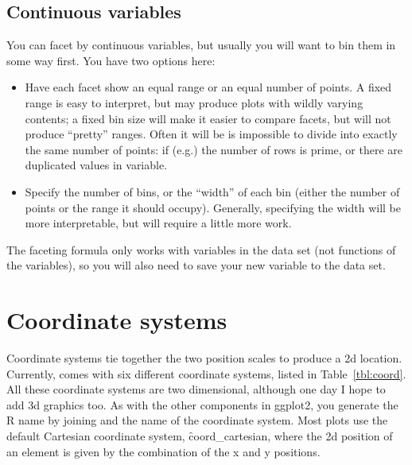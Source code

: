 \subsection{Continuous variables}\label{sub:continuous_variables}

You can facet by continuous variables, but usually you will want to bin them in some way first.  You have two options here:

\begin{itemize}
  \item Have each facet show an equal range or an equal number of points.  A fixed range is easy to interpret, but may produce plots with wildly varying contents; a fixed bin size will make it easier to compare facets, but will not produce ``pretty'' ranges.  Often it will be is impossible to divide into exactly the same number of points: if (e.g.) the number of rows is prime, or there are duplicated values in variable.
    
  \item Specify the number of bins, or the ``width'' of each bin (either the number of points or the range it should occupy).  Generally, specifying the width will be more interpretable, but will require a little more work.
  
\end{itemize}

The faceting formula only works with variables in the data set (not functions of the variables), so you will also need to save your new variable to the data set.

% 
% 
% 
% 



\section{Coordinate systems}
\label{sec:coord}

Coordinate systems tie together the two position scales to produce a 2d location. Currently, \ggplot comes with six different coordinate systems, listed in Table~\ref{tbl:coord}.  All these coordinate systems are two dimensional, although one day I hope to add 3d graphics too. As with the other components in ggplot2, you generate the R name by joining  and the name of the coordinate system.  Most plots use the default Cartesian coordinate system, \f{coord_cartesian}, where the 2d position of an element is given by the combination of the x and y positions.  

